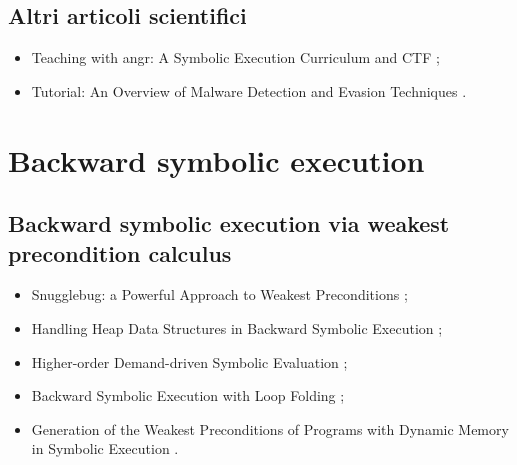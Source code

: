 \subsection*{Altri articoli scientifici}
\begin{itemize}

\item Teaching with angr: A Symbolic Execution Curriculum and CTF \cite{springer2018teaching};

\item Tutorial: An Overview of Malware Detection and Evasion Techniques \cite{biondi2018tutorial}.

\end{itemize}

\section*{Backward symbolic execution}

\subsection*{Backward symbolic execution via weakest precondition calculus}
\begin{itemize}

\item Snugglebug: a Powerful Approach to Weakest Preconditions \cite{chandra2009bsewpc};

\item Handling Heap Data Structures in Backward Symbolic Execution \cite{husak2020bsewpc};

\item Higher-order Demand-driven Symbolic Evaluation \cite{zachary2020bsewpc};

\item Backward Symbolic Execution with Loop Folding \cite{chalupa2021bsewpc};

\item Generation of the Weakest Preconditions of Programs with Dynamic Memory in Symbolic Execution \cite{misonizhnik2022bsewpc}.

\end{itemize}